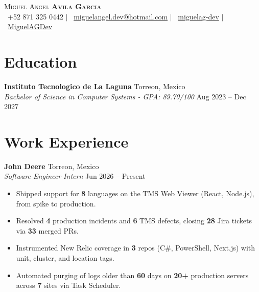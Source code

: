 \documentclass[letterpaper,11pt]{article}
\begin{document}
\begin{center}
    {\huge \scshape Miguel Angel \textbf{Avila Garcia}} \\[4pt]
    \small
    \color{cvblue}\faPhone \ \color{black}+52 871 325 0442 $|$
    \color{cvblue}\faEnvelope \ \color{black}\href{mailto:miguelangel.dev@hotmail.com}{miguelangel.dev@hotmail.com} $|$
    \color{cvblue}\faLinkedin \ \color{black}\href{https://linkedin.com/in/miguelag-dev}{miguelag-dev} $|$
    \color{cvblue}\faGithub \ \color{black}\href{https://github.com/MiguelAGDev}{MiguelAGDev}
\end{center}
\vspace{-10pt}
\section{\textbf{Education}}
\textbf{Instituto Tecnologico de La Laguna} \hfill \color{cvblue}Torreon, Mexico \color{black} \\
\textit{\color{cvblue}Bachelor of Science in Computer Systems - GPA: 89.70/100 }  \hfill Aug 2023 -- Dec 2027\\
\section{\textbf{Work Experience}}
\textbf{John Deere} \hfill \color{cvblue}Torreon, Mexico \color{black} \\
\textit{\color{cvblue}Software Engineer Intern} \hfill Jun 2026 -- Present\\
\begin{itemize}
    \item Shipped support for \textbf{8} languages on the TMS Web Viewer (React, Node.js), from spike to production.
    \item Resolved \textbf{4} production incidents and \textbf{6} TMS defects, closing \textbf{28} Jira tickets via \textbf{33} merged PRs.
    \item Instrumented New Relic coverage in \textbf{3} repos (C\#, PowerShell, Next.js) with unit, cluster, and location tags.
    \item Automated purging of logs older than \textbf{60} days on \textbf{20+} production servers across \textbf{7} sites via Task Scheduler.
\end{itemize}
\end{document}
